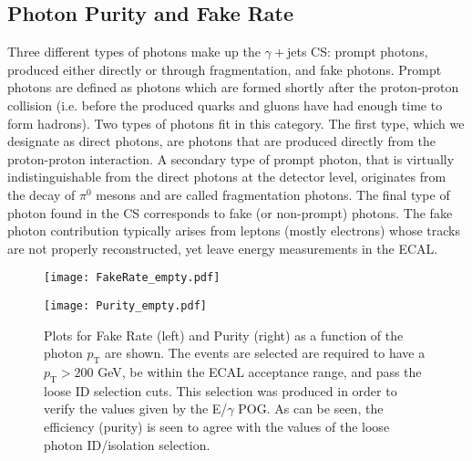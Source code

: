 \subsection{Photon Purity and Fake Rate}\label{purity&fakerate}

Three different types of photons make up the $\gamma+$jets CS: prompt photons, produced either directly or through fragmentation, and fake photons. Prompt photons are defined as photons which are formed shortly after the proton-proton collision (i.e. before the produced quarks and gluons have had enough time to form hadrons). Two types of photons fit in this category. The first type, which we designate as direct photons, are photons that are produced directly from the proton-proton interaction\cite{promptPho}. A secondary type of prompt photon, that is virtually indistinguishable from the direct photons at the detector level, originates from the decay of $\pi^0$ mesons and are called fragmentation photons. The final type of photon found in the CS corresponds to fake (or non-prompt) photons. The fake photon contribution typically arises from leptons (mostly electrons) whose tracks are not properly reconstructed, yet leave energy measurements in the ECAL.

\begin{figure}[H]
\begin{center}
\begin{minipage}[b]{0.49\textwidth}
\texttt{[image: FakeRate\_empty.pdf]}
\end{minipage}
\begin{minipage}[b]{0.49\textwidth}
    \texttt{[image: Purity\_empty.pdf]}
\end{minipage}
\end{center}
\vspace{-1em}
\caption{Plots for Fake Rate (left) and Purity (right) as a function of the photon $p_\text{T}$ are shown. The events are selected are required to have a $p_\text{T} > 200$ GeV, be within the ECAL acceptance range, and pass the loose ID selection cuts. This selection was produced in order to verify the values given by the E/$\gamma$ POG. As can be seen, the efficiency (purity) is seen to agree with the values of the loose photon ID/isolation selection.}
\label{FakeRatePurityLoose}
\end{figure}

